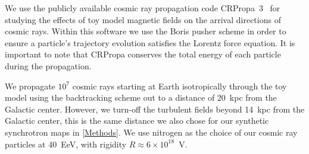 \documentclass[usenatbib]{mnras}
\begin{document}
We use the publicly available cosmic ray propagation code CRPropa~3~\citep{CRPropa3_2016} for studying the effects of toy model magnetic fields on the arrival directions of cosmic rays. Within this software we use the Boris pusher scheme in order to ensure a particle's trajectory evolution satisfies the Lorentz force equation. It is important to note that CRPropa conserves the total energy of each particle during the propagation.

We propagate $10^7$ cosmic rays starting at Earth isotropically through the toy model using the backtracking scheme out to a distance of 20~kpc from the Galactic center. However, we turn-off the turbulent fields beyond 14~kpc from the Galactic center, this is the same distance we also chose for our synthetic synchrotron maps in \ref{Methods}. We use nitrogen as the choice of our cosmic ray particles at 40~EeV, with rigidity $R\approx 6 \times 10^{18}$~V. 
\end{document}
